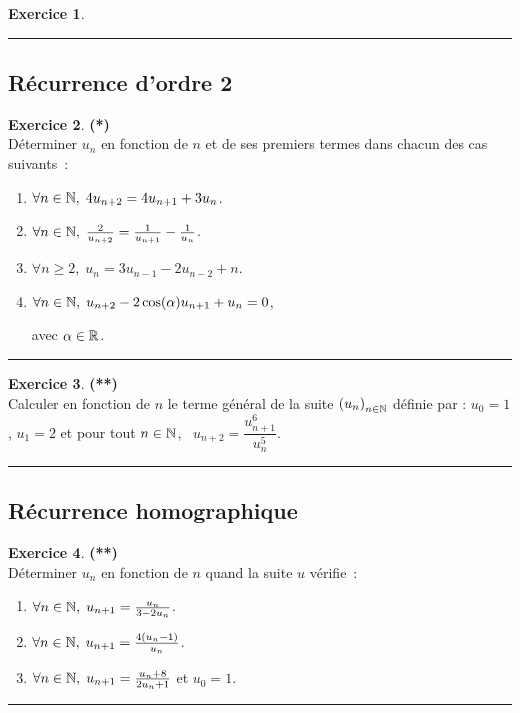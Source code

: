 \documentclass[a4paper,11pt]{article}
\theoremstyle{definition}
\newtheorem{exo}{Exercice} %
\begin{document}
\begin{minipage}{1\linewidth}
\begin{minipage}[t]{0.48\linewidth}
\begin{exo}
	\centering
	\rule{1\linewidth}{0.6pt}
\end{exo}


\end{minipage}	
\hfill\vrule\hfill
\begin{minipage}[t]{0.48\linewidth}
\raggedright

	\subsection*{Récurrence d’ordre 2}
\begin{exo}\textbf{(*)}\quad\\[0.2cm]
	Déterminer $u_n$ en fonction de $n$ et de ses premiers termes dans chacun des cas suivants~:
	
	\begin{enumerate}
		\item  $\forall n\in\mathbb{N},\;4u_{n+2}=4u_{n+1}+3u_n$.
		\item  $\forall n\in\mathbb{N},\;\frac{2}{u_{n+2}}=\frac{1}{u_{n+1}}-\frac{1}{u_n}$.
		\item  $\forall n\geq2,\;u_n= 3u_{n-1}-2u_{n-2}+n$.
		\item $ \forall n\in\mathbb{N},\; u_{n+2}- 2 \cos(\alpha)u_{n+1}+ u_n = 0$,
		
		 avec $\alpha\in\mathbb{R}$.
	\end{enumerate}

	\centering
	\rule{1\linewidth}{0.6pt}
\end{exo}


\begin{exo}\textbf{(**)}\quad\\[0.2cm]
	Calculer en fonction de $n$ le terme général de la suite $\left(u_n\right)_{n\in\mathbb{N}}$ définie par :
$u_0 = 1$, $u_1 = 2$ et pour tout $n\in\mathbb{N}$, \  $u_{n+2} = \dfrac{u_{n+1}^6}{u_{n}^5}$.

	\centering
	\rule{1\linewidth}{0.6pt}
\end{exo}

\subsection*{Récurrence homographique}

\begin{exo}\textbf{(**)}\quad\\[0.2cm]
	Déterminer $u_n$ en fonction de $n$ quand la suite $u$ vérifie~:
	\begin{enumerate}
		\item $\forall n\in\mathbb{N},\;u_{n+1}=\frac{u_n}{3-2u_n}$.
		\item $\forall n\in\mathbb{N},\;u_{n+1}=\frac{4(u_n-1)}{u_n}$.
		\item $\forall n\in\mathbb{N},\;u_{n+1}=\frac{u_n+8}{2u_n+1}$ et $u_0=1$. %
	\end{enumerate}
	
	\centering
	\rule{1\linewidth}{0.6pt}
\end{exo}






\end{minipage}
\end{minipage}
\end{document}
